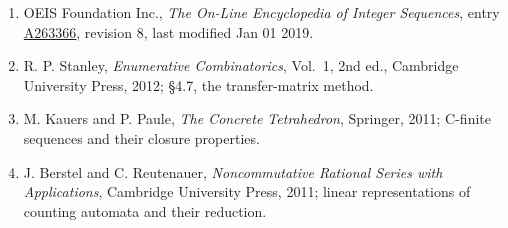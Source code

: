 \documentclass[11pt]{article}
\theoremstyle{definition}
\begin{document}
\begin{enumerate}

\item OEIS Foundation Inc., \emph{The On-Line Encyclopedia of Integer Sequences}, entry \href{https://oeis.org/A263366}{A263366}, revision 8, last modified Jan 01 2019.

\item R. P. Stanley, \emph{Enumerative Combinatorics}, Vol.~1, 2nd ed., Cambridge University Press, 2012; \S4.7, the transfer-matrix method.

\item M. Kauers and P. Paule, \emph{The Concrete Tetrahedron}, Springer, 2011; C-finite sequences and their closure properties.

\item J. Berstel and C. Reutenauer, \emph{Noncommutative Rational Series with Applications}, Cambridge University Press, 2011; linear representations of counting automata and their reduction.

\end{enumerate}
\end{document}
